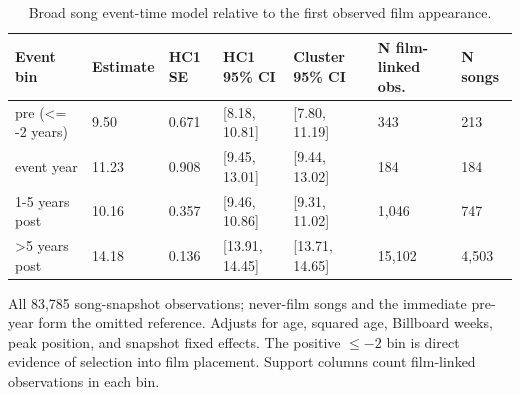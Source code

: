 \begin{table}[!htbp]
\centering
\footnotesize
\caption{Broad song event-time model relative to the first observed film appearance.}
\label{tab:si-temporal-event-time}
\renewcommand{\arraystretch}{1.05}
\begin{tabular}{lllllll}
\toprule
Event bin & Estimate & HC1 SE & HC1 95\% CI & Cluster 95\% CI & N film-linked obs. & N songs \\
\midrule
pre (<= -2 years) & 9.50 & 0.671 & [8.18, 10.81] & [7.80, 11.19] & 343 & 213 \\
event year & 11.23 & 0.908 & [9.45, 13.01] & [9.44, 13.02] & 184 & 184 \\
1-5 years post & 10.16 & 0.357 & [9.46, 10.86] & [9.31, 11.02] & 1,046 & 747 \\
>5 years post & 14.18 & 0.136 & [13.91, 14.45] & [13.71, 14.65] & 15,102 & 4,503 \\
\bottomrule
\end{tabular}
\begin{flushleft}\footnotesize
All 83{,}785 song-snapshot observations; never-film songs and the immediate pre-year form the omitted reference. Adjusts for age, squared age, Billboard weeks, peak position, and snapshot fixed effects. The positive $\leq -2$ bin is direct evidence of selection into film placement. Support columns count film-linked observations in each bin.
\end{flushleft}
\end{table}
